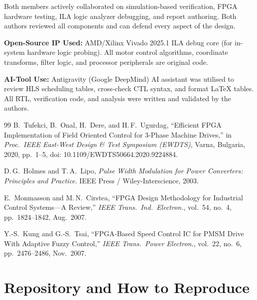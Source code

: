 \documentclass[11pt,a4paper]{article}
\begin{document}
Both members actively collaborated on simulation-based verification, FPGA hardware testing, ILA logic analyzer debugging, and report authoring. Both authors reviewed all components and can defend every aspect of the design.

\textbf{Open-Source IP Used:} AMD/Xilinx Vivado 2025.1 ILA debug core (for in-system hardware logic probing). All motor control algorithms, coordinate transforms, filter logic, and processor peripherals are original code.

\textbf{AI-Tool Use:} Antigravity (Google DeepMind) AI assistant was utilised to review HLS scheduling tables, cross-check CTL syntax, and format LaTeX tables. All RTL, verification code, and analysis were written and validated by the authors.

\begin{thebibliography}{99}
B.~Tufekci, B.~Onal, H.~Dere, and H.\,F.~Ugurdag, ``Efficient FPGA Implementation of Field Oriented Control for 3-Phase Machine Drives,'' in \emph{Proc.\ IEEE East-West Design \& Test Symposium (EWDTS)}, Varna, Bulgaria, 2020, pp.~1--5, doi: 10.1109/EWDTS50664.2020.9224884.

D.\,G.~Holmes and T.\,A.~Lipo, \emph{Pulse Width Modulation for Power Converters: Principles and Practice}. IEEE Press / Wiley-Interscience, 2003.

E.~Monmasson and M.\,N.~Cirstea, ``FPGA Design Methodology for Industrial Control Systems---A Review,'' \emph{IEEE Trans.\ Ind.\ Electron.}, vol.~54, no.~4, pp.~1824--1842, Aug.~2007.

Y.-S.~Kung and G.-S.~Tsai, ``FPGA-Based Speed Control IC for PMSM Drive With Adaptive Fuzzy Control,'' \emph{IEEE Trans.\ Power Electron.}, vol.~22, no.~6, pp.~2476--2486, Nov.~2007.
\end{thebibliography}

\appendix
\section{Repository and How to Reproduce}
\label{app:repo}
\end{document}
